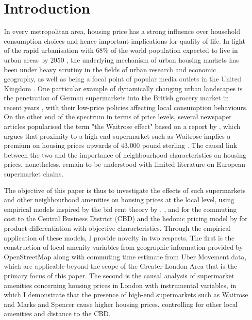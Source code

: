 \documentclass{article}
\begin{document}
\section{Introduction} \label{section:intro}
In every metropolitan area, housing price has a strong influence over household consumption choices and hence important implications for quality of life. In light of the rapid urbanisation with 68\% of the world population expected to live in urban areas by 2050 \citep{UnitedNations201868UN}, the underlying mechanism of urban housing markets has been under heavy scrutiny in the fields of urban research and economic geography, as well as being a focal point of popular media outlets in the United Kingdom \citep{TheGuardian2019HousingMarket}. One particular example of dynamically changing urban landscapes is the penetration of German supermarkets into the British grocery market in recent years \citep{Davey2018AldiMarket}, with their low-price policies affecting local consumption behaviours. On the other end of the spectrum in terms of price levels, several newspaper articles popularised the term "the Waitrose effect" based on a report by \citet{LloydsBank2016LivingHome}, which argues that proximity to a high-end supermarket such as Waitrose implies a premium on housing prices upwards of 43,000 pound sterling \citep{TheIndependent2017WaitrosePounds}. The causal link between the two and the importance of neighbourhood characteristics on housing prices, nonetheless, remain to be understood with limited literature on European supermarket chains.

The objective of this paper is thus to investigate the effects of such supermarkets and other neighbourhood amenities on housing prices at the local level, using empirical models inspired by the bid rent theory by \citet{AlonsoWilliam1964Lalu}, \citet{MuthRichardF.1969Cah:}, and \citet{MillsEdwinSmith1972Sits} for the commuting cost to the Central Business District (CBD) and the hedonic pricing model by \citet{Rosen1984} for product differentiation with objective characteristics. Through the empirical application of these models, I provide novelty in two respects. The first is the construction of local amenity variables from geographic information provided by OpenStreetMap along with commuting time estimate from Uber Movement data, which are applicable beyond the scope of the Greater London Area that is the primary focus of this paper. The second is the causal analysis of supermarket amenities concerning housing prices in London with instrumental variables, in which I demonstrate that the presence of high-end supermarkets such as Waitrose and Marks and Spencer cause higher housing prices, controlling for other local amenities and distance to the CBD.
\end{document}
